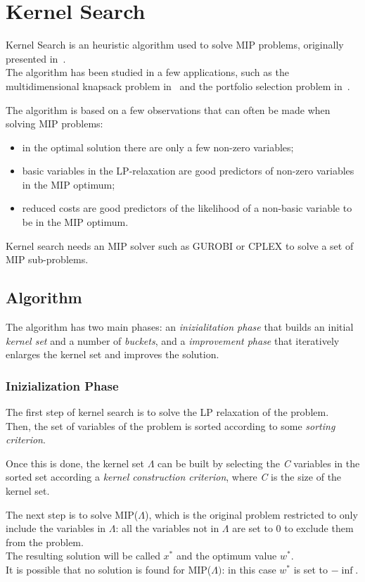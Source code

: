 \chapter{Kernel Search}

Kernel Search is an heuristic algorithm used to solve MIP problems, originally presented in~\cite{kernel:2007}.\\
The algorithm has been studied in a few applications, such as the multidimensional knapsack problem
in~\cite{kernel:2010} and the portfolio selection problem in~\cite{kernel:2012}.

The algorithm is based on a few observations that can often be made when solving MIP problems:
\begin{itemize}
    \item in the optimal solution there are only a few non-zero variables;
    \item basic variables in the LP-relaxation are good predictors of non-zero variables in the MIP optimum;
    \item reduced costs are good predictors of the likelihood of a non-basic variable to be in the MIP optimum.
\end{itemize}

Kernel search needs an MIP solver such as GUROBI or CPLEX to solve a set of MIP sub-problems.

\section{Algorithm}
The algorithm has two main phases: an \textit{inizialitation phase}
that builds an initial \textit{kernel set} and a number of \textit{buckets},
and a \textit{improvement phase} that iteratively enlarges the kernel set and improves the solution.

\subsection{Inizialization Phase}
The first step of kernel search is to solve the LP relaxation of the problem.\\
Then, the set of variables of the problem is sorted according to some \textit{sorting criterion}.

Once this is done, the kernel set \(\Lambda\) can be built by selecting the \textit{C}
variables in the sorted set according a \textit{kernel construction criterion},
where \textit{C} is the size of the kernel set.

The next step is to solve MIP(\(\Lambda\)),
which is the original problem restricted to only include the variables in \(\Lambda\):
all the variables not in \(\Lambda\) are set to 0 to exclude them from the problem.\\
The resulting solution will be called \(x^{*}\) and the optimum value \(w^{*}\).\\
It is possible that no solution is found for MIP(\(\Lambda)\): in this case \(w^{*}\) is set to \(-\inf\).

